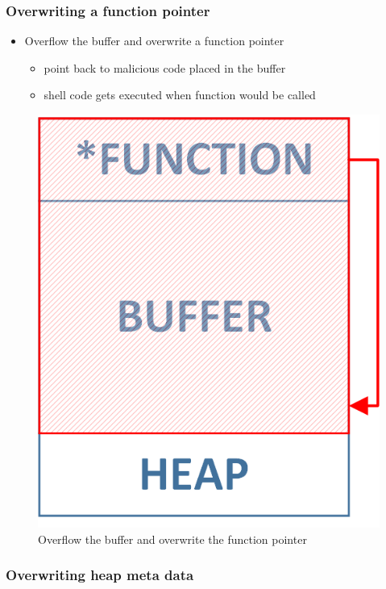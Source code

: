 \documentclass[12pt,titlepage,a4paper]{report}
\begin{document}
	\subsubsection{Overwriting a function pointer}
	\begin{itemize}
		\item Overflow the buffer and overwrite a function pointer
		\begin{itemize}
			\item point back to malicious code placed in the buffer
			\item shell code gets executed when function would be called
		\end{itemize}
	\end{itemize}

	\begin{figure}[h]
		\centering
		\includegraphics*[scale=0.75]{assets/img/HeapBufferOverflowFunctionPointer.png}
		\caption{\label{img:heapBufferOverflowFuncionPointer}Overflow the buffer and overwrite the function pointer}
	\end{figure}
	
	\subsubsection{Overwriting heap meta data}
	
\end{document}

